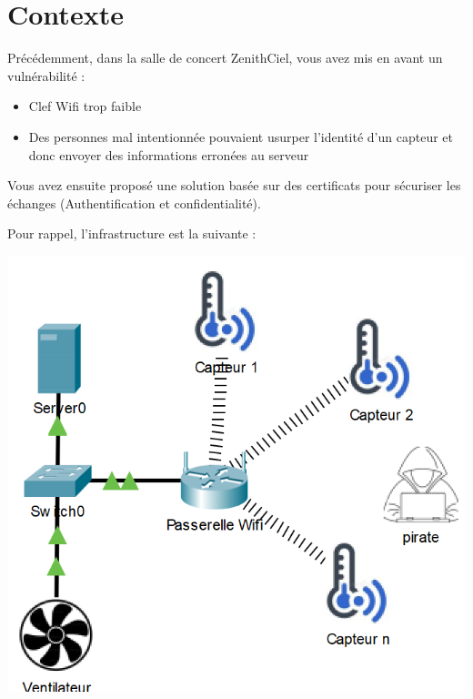 \documentclass[french, 12pt]{article}%
\newcommand{\itemE}{\item[$\bullet$]}
\begin{document}
\vspace{0.25cm}


\section{Contexte}

Précédemment, dans la salle de concert ZenithCiel, vous avez mis en avant un vulnérabilité : 
\begin{itemize}
\itemE Clef Wifi trop faible
\itemE Des personnes mal intentionnée pouvaient usurper l'identité d'un capteur et donc envoyer des informations erronées au serveur
\end{itemize}

Vous avez ensuite proposé une solution basée sur des certificats pour sécuriser les échanges (Authentification et confidentialité).

Pour rappel, l'infrastructure est la suivante : 

\begin{center}
\includegraphics[scale=0.4]{./ressource/topologIeWifiEntreprise.png}
\end{center}
\end{document}
